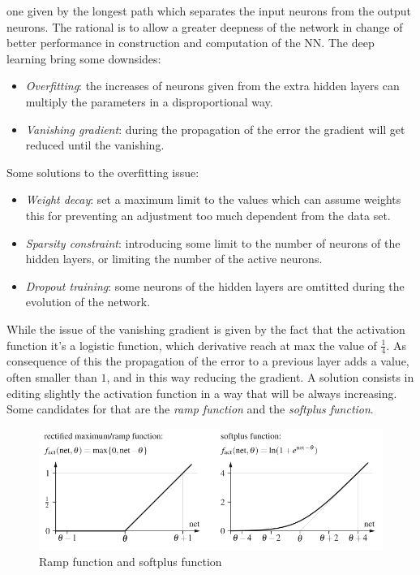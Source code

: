 \documentclass{article}
\begin{document}
one given by the longest path which separates the input neurons from the output neurons.
\newline\newline
The rational is to allow a greater deepness of the network in change of better performance in construction
and computation of the NN. The deep learning bring some downsides:
\begin{itemize}
    \item \textit{Overfitting}: the increases of neurons given from the extra hidden layers can multiply
          the parameters in a disproportional way.
    \item \textit{Vanishing gradient}: during the propagation of the error the gradient will get reduced
          until the vanishing.
\end{itemize}
Some solutions to the overfitting issue:
\begin{itemize}
    \item \textit{Weight decay}: set a maximum limit to the values which can assume weights
          this for preventing an adjustment too much dependent from the data set.
    \item \textit{Sparsity constraint}: introducing some limit to the number of neurons of the
          hidden layers, or limiting the number of the active neurons.
    \item \textit{Dropout training}: some neurons of the hidden layers are omtitted during the
          evolution of the network.
\end{itemize}
While the issue of the vanishing gradient is given by the fact that the activation function it's a
logistic function, which derivative reach at max the value of $\frac{1}{4}$. As consequence of this
the propagation of the error to a previous layer adds a value, often smaller than $1$, and in this
way reducing the gradient.
\newline\newline
A solution consists in editing slightly the activation function in a way that will be always increasing.
Some candidates for that are the \textit{ramp function} and the \textit{softplus function}.
\begin{figure}
    \centering
    \includegraphics[scale=0.5]{images/ramp_softplus.png}
    \caption{Ramp function and softplus function}
\end{figure}
\end{document}
